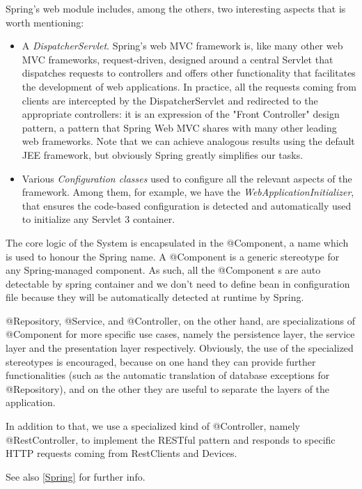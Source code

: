 \documentclass[12pt]{article}
\begin{document}
Spring’s web module includes, among the others, two interesting aspects that is worth mentioning:
\begin{itemize}
\item A \textit{DispatcherServlet}. Spring’s web MVC framework is, like many other web MVC frameworks, request-driven, designed around a central Servlet that dispatches requests to controllers and offers other functionality that facilitates the development of web applications. In practice, all the requests coming from clients are intercepted by the DispatcherServlet and redirected to the appropriate controllers: it is an expression of the "Front Controller" design pattern, a pattern that Spring Web MVC shares with many other leading web frameworks.
Note that we can achieve analogous results using the default JEE framework, but obviously Spring greatly simplifies our tasks.
\item Various \textit{Configuration classes} used to configure all the relevant aspects of the framework. Among them, for example, we have the \textit{WebApplicationInitializer}, that ensures the code-based configuration is detected and automatically used to initialize any Servlet 3 container.
\end{itemize}

\bigskip

The core logic of the System is encapsulated in the @Component, a name which is used to honour the Spring name. 
A @Component is a generic stereotype for any Spring-managed component. As such, all the @Component s are auto detectable by spring container and we don't need to define bean in configuration file because they will be automatically detected at runtime by Spring.

@Repository, @Service, and @Controller, on the other hand, are specializations of @Component for more specific use cases, namely the persistence layer, the service layer and the presentation layer respectively. Obviously, the use of the specialized stereotypes is encouraged, because on one hand they can provide further functionalities (such as the automatic translation of database exceptions for @Repository), and on the other they are useful to separate the layers of the application.

In addition to that, we use a specialized kind of @Controller, namely @RestController, to implement the RESTful pattern and responds to specific HTTP requests coming from RestClients and Devices.

See also \ref{Spring} for further info.
\end{document}
